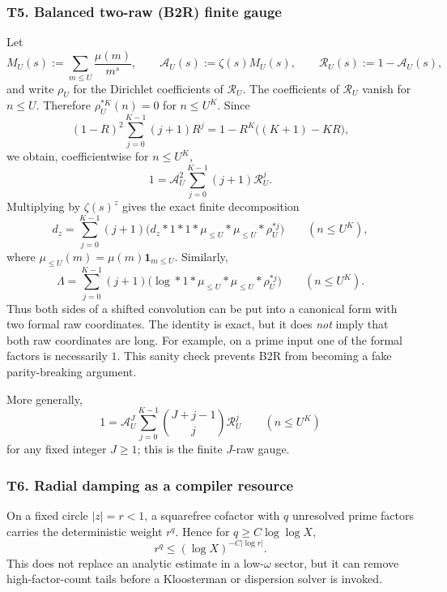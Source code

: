\documentclass[11pt]{article}
\theoremstyle{definition}
\theoremstyle{remark}
\newcommand{\1}{\mathbf 1}
\begin{document}
\subsubsection*{T5. Balanced two-raw (B2R) finite gauge}

Let
\[
 M_U(s):=\sum_{m\le U}\frac{\mu(m)}{m^s},
 \qquad
 \mathcal A_U(s):=\zeta(s)M_U(s),
 \qquad
 \mathcal R_U(s):=1-\mathcal A_U(s),
\]
and write \(\rho_U\) for the Dirichlet coefficients of \(\mathcal R_U\).
The coefficients of \(\mathcal R_U\) vanish for \(n\le U\).  Therefore
\(\rho_U^{*K}(n)=0\) for \(n\le U^K\).  Since
\[
 (1-R)^2\sum_{j=0}^{K-1}(j+1)R^j
 =1-R^K\bigl((K+1)-KR\bigr),
\]
we obtain, coefficientwise for \(n\le U^K\),
\begin{equation}\label{eq:tool-b2r-unit}
 1=\mathcal A_U^2\sum_{j=0}^{K-1}(j+1)\mathcal R_U^j.
\end{equation}
Multiplying by \(\zeta(s)^z\) gives the exact finite decomposition
\begin{equation}\label{eq:tool-b2r-dz}
 d_z
 =\sum_{j=0}^{K-1}(j+1)
 \bigl(d_z*1*1*\mu_{\le U}*\mu_{\le U}*\rho_U^{*j}\bigr)
 \qquad(n\le U^K),
\end{equation}
where \(\mu_{\le U}(m)=\mu(m)\1_{m\le U}\).  Similarly,
\begin{equation}\label{eq:tool-b2r-Lambda}
 \Lambda
 =\sum_{j=0}^{K-1}(j+1)
 \bigl(\log*1*\mu_{\le U}*\mu_{\le U}*\rho_U^{*j}\bigr)
 \qquad(n\le U^K).
\end{equation}
Thus both sides of a shifted convolution can be put into a canonical form with
two formal raw coordinates.  The identity is exact, but it does \emph{not}
imply that both raw coordinates are long.  For example, on a prime input one
of the formal factors is necessarily \(1\).  This sanity check prevents B2R
from becoming a fake parity-breaking argument.

More generally,
\[
 1=\mathcal A_U^J
 \sum_{j=0}^{K-1}\binom{J+j-1}{j}\mathcal R_U^j
 \qquad(n\le U^K)
\]
for any fixed integer \(J\ge1\); this is the finite \(J\)-raw gauge.

\subsubsection*{T6. Radial damping as a compiler resource}

On a fixed circle \(|z|=r<1\), a squarefree cofactor with \(q\) unresolved prime
factors carries the deterministic weight \(r^q\).  Hence for
\(q\ge C\log\log X\),
\[
 r^q\le (\log X)^{-C|\log r|}.
\]
This does not replace an analytic estimate in a low-\(\omega\) sector, but it can
remove high-factor-count tails before a Kloosterman or dispersion solver is
invoked.
\end{document}
